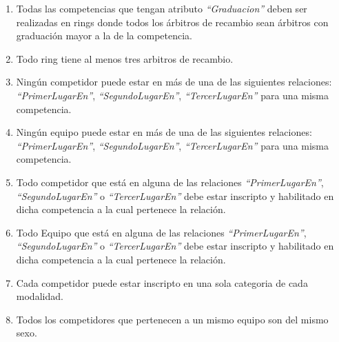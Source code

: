 \begin{enumerate}
    \item Todas las competencias que tengan atributo \textit{``Graduacion''} deben ser realizadas en rings donde todos los árbitros de recambio sean árbitros con graduación mayor a la de la competencia.
    \item Todo ring tiene al menos tres arbitros de recambio.
    \item Ningún competidor puede estar en más de una de las siguientes relaciones: \textit{``PrimerLugarEn''}, \textit{``SegundoLugarEn''}, \textit{``TercerLugarEn''} para una misma competencia.
    \item Ningún equipo puede estar en más de una de las siguientes relaciones: \textit{``PrimerLugarEn''}, \textit{``SegundoLugarEn''}, \textit{``TercerLugarEn''} para una misma competencia.
    \item Todo competidor que está en alguna de las relaciones \textit{``PrimerLugarEn''}, \textit{``SegundoLugarEn''} o \textit{``TercerLugarEn''} debe estar inscripto y habilitado en dicha competencia a la cual pertenece la relación.
    \item Todo Equipo que está en alguna de las relaciones \textit{``PrimerLugarEn''}, \textit{``SegundoLugarEn''} o \textit{``TercerLugarEn''} debe estar inscripto y habilitado en dicha competencia a la cual pertenece la relación.
    \item Cada competidor puede estar inscripto en una sola categoria de cada modalidad.
    \item Todos los competidores que pertenecen a un mismo equipo son del mismo sexo.
\end{enumerate}

